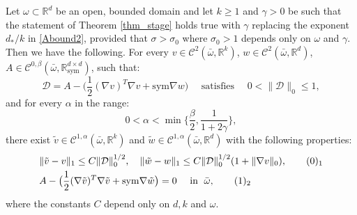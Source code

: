 \documentclass[10pt,a4paper]{amsart}
\newcommand{\R}{\mathbb{R}}
\newcommand{\sym}{\mathrm{sym}}
\begin{document}
\begin{theorem}\label{th_NashKuiHol}
Let $\omega\subset\R^d$ be an open, bounded domain 
and let $k\geq 1$ and $\gamma>0$ be such that the statement of Theorem \ref{thm_stage}
holds true with $\gamma$ replacing the exponent $d_*/k$ in
\ref{Abound2}, provided that $\sigma>\sigma_0$ where $\sigma_0>1$
depends only on $\omega$ and $\gamma$. Then we have the following.  
For every $v\in\mathcal{C}^2(\bar\omega,\R^k)$, $w\in\mathcal{C}^2(\bar\omega,\R^d)$,
$A\in\mathcal{C}^{0,\beta}(\bar\omega, \R^{d\times d}_\sym)$, such that:
$$\mathcal{D}=A-\big(\frac{1}{2}(\nabla v)^T\nabla v + \sym\nabla
w\big) \quad\mbox{ satisfies } \quad 0<\|\mathcal{D}\|_0\leq 1,$$
and for every $\alpha$ in the range:
\begin{equation}\label{rangeAl}
0< \alpha <\min\Big\{\frac{\beta}{2},\frac{1}{1+2\gamma}\Big\},
\end{equation}
there exist $\tilde v\in\mathcal{C}^{1,\alpha}(\bar\omega,\R^k)$ and
$\tilde w\in\mathcal{C}^{1,\alpha}(\bar\omega,\R^d)$ with the following properties:
\begin{align*}
& \|\tilde v - v\|_1\leq C\|\mathcal{D}\|_0^{1/2}, \quad \|\tilde w -
w\|_1\leq C\|\mathcal{D}\|_0^{1/2}(1+\|\nabla v\|_0),
\tag*{(\theequation)$_1$}\refstepcounter{equation} \label{Hbound1}\vspace{1mm}\\
& A-\big(\frac{1}{2}(\nabla \tilde v)^T\nabla \tilde v + \sym\nabla
\tilde w\big) =0 \quad\mbox{ in }\; \bar\omega, \tag*{(\theequation)$_2$}\label{Hbound2} 
\end{align*}
where the constants $C$ depend only on $d, k$ and $\omega$.
\end{theorem}
\end{document}
